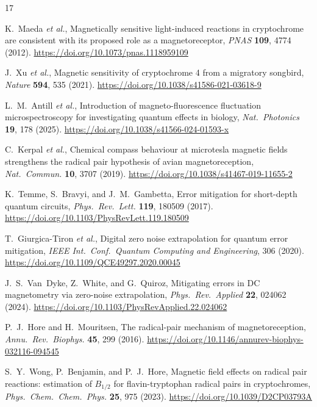 \documentclass[preprint,amsmath,amssymb]{revtex4-2}
\begin{document}
\begin{thebibliography}{17}

K.~Maeda \emph{et al.}, Magnetically sensitive light-induced reactions in cryptochrome are consistent with its proposed role as a magnetoreceptor, \emph{PNAS} \textbf{109}, 4774 (2012). \url{https://doi.org/10.1073/pnas.1118959109}

J.~Xu \emph{et al.}, Magnetic sensitivity of cryptochrome 4 from a migratory songbird, \emph{Nature} \textbf{594}, 535 (2021). \url{https://doi.org/10.1038/s41586-021-03618-9}

L.~M.~Antill \emph{et al.}, Introduction of magneto-fluorescence fluctuation microspectroscopy for investigating quantum effects in biology, \emph{Nat.\ Photonics} \textbf{19}, 178 (2025). \url{https://doi.org/10.1038/s41566-024-01593-x}

C.~Kerpal \emph{et al.}, Chemical compass behaviour at microtesla magnetic fields strengthens the radical pair hypothesis of avian magnetoreception, \emph{Nat.\ Commun.} \textbf{10}, 3707 (2019). \url{https://doi.org/10.1038/s41467-019-11655-2}

K.~Temme, S.~Bravyi, and J.~M.~Gambetta, Error mitigation for short-depth quantum circuits, \emph{Phys.\ Rev.\ Lett.} \textbf{119}, 180509 (2017). \url{https://doi.org/10.1103/PhysRevLett.119.180509}

T.~Giurgica-Tiron \emph{et al.}, Digital zero noise extrapolation for quantum error mitigation, \emph{IEEE Int.\ Conf.\ Quantum Computing and Engineering}, 306 (2020). \url{https://doi.org/10.1109/QCE49297.2020.00045}

J.~S.~Van~Dyke, Z.~White, and G.~Quiroz, Mitigating errors in DC magnetometry via zero-noise extrapolation, \emph{Phys.\ Rev.\ Applied} \textbf{22}, 024062 (2024). \url{https://doi.org/10.1103/PhysRevApplied.22.024062}

P.~J.~Hore and H.~Mouritsen, The radical-pair mechanism of magnetoreception, \emph{Annu.\ Rev.\ Biophys.} \textbf{45}, 299 (2016). \url{https://doi.org/10.1146/annurev-biophys-032116-094545}

S.~Y.~Wong, P.~Benjamin, and P.~J.~Hore, Magnetic field effects on radical pair reactions: estimation of $B_{1/2}$ for flavin-tryptophan radical pairs in cryptochromes, \emph{Phys.\ Chem.\ Chem.\ Phys.} \textbf{25}, 975 (2023). \url{https://doi.org/10.1039/D2CP03793A}


\end{thebibliography}
\end{document}
